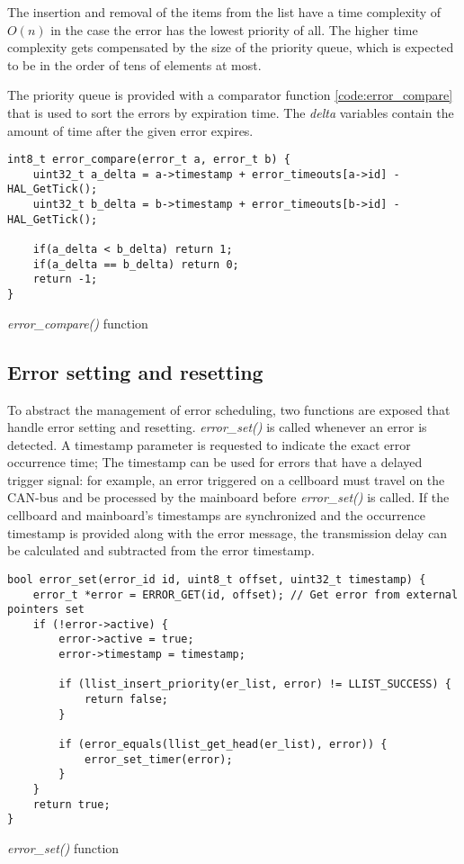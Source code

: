 The insertion and removal of the items from the list have a time complexity of $O(n)$ in the case the error has the lowest priority of all. The higher time complexity gets compensated by the size of the priority queue, which is expected to be in the order of tens of elements at most.

The priority queue is provided with a comparator function \autoref{code:error_compare} that is used to sort the errors by expiration time. The \textit{delta} variables contain the amount of time after the given error expires.

\begin{listing}[h]
	\begin{verbatim}
int8_t error_compare(error_t a, error_t b) {
	uint32_t a_delta = a->timestamp + error_timeouts[a->id] - HAL_GetTick();
	uint32_t b_delta = b->timestamp + error_timeouts[b->id] - HAL_GetTick();

	if(a_delta < b_delta) return 1;
	if(a_delta == b_delta) return 0;
	return -1;
}
	\end{verbatim}
	\caption{\textit{error\_compare()} function}
	\label{code:error_compare}
\end{listing}

\subsection{Error setting and resetting}
To abstract the management of error scheduling, two functions are exposed that handle error setting and resetting. \textit{error\_set()} is called whenever an error is detected. A timestamp parameter is requested to indicate the exact error occurrence time; The timestamp can be used for errors that have a delayed trigger signal: for example, an error triggered on a cellboard must travel on the CAN-bus and be processed by the mainboard before \textit{error\_set()} is called. If the cellboard and mainboard's timestamps are synchronized and the occurrence timestamp is provided along with the error message, the transmission delay can be calculated and subtracted from the error timestamp.
\begin{listing}[h]
	\begin{verbatim}
bool error_set(error_id id, uint8_t offset, uint32_t timestamp) {
	error_t *error = ERROR_GET(id, offset); // Get error from external pointers set
	if (!error->active) {
		error->active = true;
		error->timestamp = timestamp;

		if (llist_insert_priority(er_list, error) != LLIST_SUCCESS) {
			return false;
		}

		if (error_equals(llist_get_head(er_list), error)) {
			error_set_timer(error);
		}
	}
	return true;
}	
	\end{verbatim}
	\caption{\textit{error\_set()} function}
	\label{code:error_set}
\end{listing}

